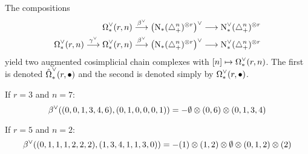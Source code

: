 The compositions
\begin{align*}
	\operatorname{\Omega}^{\vee}_{*}(r,n)&\overset{\beta^\vee}{\longrightarrow} \left(\operatorname{N}_{*}(\triangle_{+}^n)^{ \otimes  r}\right)^\vee \longrightarrow \operatorname{N}^\vee_{*}(\triangle_{+}^n)^{ \otimes  r}
	\\
	\operatorname{\Omega}^{\vee}_{*}(r,n)\overset{\gamma^\vee}{\longrightarrow}	\operatorname{\Omega}^{\vee}_{*}(r,n)&\overset{\beta^\vee}{\longrightarrow} \left(\operatorname{N}_{*}(\triangle_{+}^n)^{ \otimes  r}\right)^\vee \longrightarrow \operatorname{N}^\vee_{*}(\triangle_{+}^n)^{ \otimes  r}
\end{align*}
	yield two augmented cosimplicial chain complexes with $[n]\mapsto \operatorname{\Omega}^{\vee}_{*}(r,n)$. The first is denoted $\hat{\operatorname{\Omega}}^{\vee}_{*}(r,\bullet)$ and the second is denoted simply by $\operatorname{\Omega}^{\vee}_{*}(r,\bullet)$.
\begin{example}\label{example:betadual3} If $r=3$ and $n=7$:
\[
		\beta^\vee((0,0,1,3,4,6),(0,1,0,0,0,1)) = -\emptyset \otimes  (0,6) \otimes  (0,1,3,4)
	\]
	\end{example}
	\begin{example}\label{example:betadual5} If $r=5$ and $n=2$:
	\[
		\beta^\vee((0,1,1,1,2,2,2),(1,3,4,1,1,3,0)) = -(1) \otimes  (1,2) \otimes  \emptyset \otimes  (0,1,2) \otimes  (2)
	\]
	\end{example}

